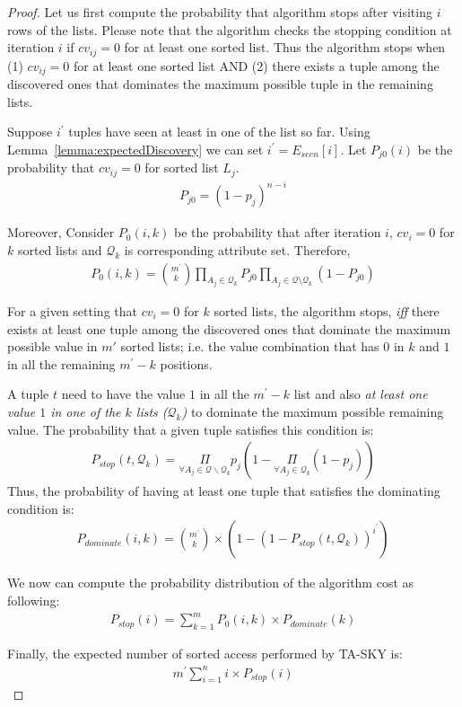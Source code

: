 \begin{proof}
Let us first compute the probability that algorithm stops after visiting $i$ rows of the lists. Please note that the algorithm checks the stopping condition at iteration $i$ if $cv_{ij} = 0$ for at least one sorted list. Thus the algorithm stops when (1) $cv_{ij} = 0$ for at least one sorted list AND (2) there exists a tuple among the discovered ones that dominates the maximum possible tuple in the remaining lists.

Suppose $i^\prime$ tuples have seen at least in one of the list so far. Using Lemma~\ref{lemma:expectedDiscovery} we can set $i^\prime = E_{seen}[i]$. Let $P_{j0}(i)$ be the probability that $cv_{ij} = 0$ for sorted list $L_j$.
\begin{align}
P_{j0} = (1 - p_j)^{n-i}
\end{align}

Moreover, Consider $P_0(i, k)$ be the probability that after iteration $i$, $cv_i = 0$ for $k$ sorted lists and $\mathcal{Q}_k$ is corresponding attribute set. Therefore,
\begin{align}
P_0(i, k) = {m^\prime \choose k} \prod_{A_j \in \mathcal{Q}_k} P_{j0} \prod_{A_j \in \mathcal{Q} \setminus \mathcal{Q}_k} (1 - P_{j0})
\end{align}

For a given setting that $cv_i = 0$ for $k$ sorted lists, the algorithm stops, {\it iff} there exists at least one tuple among the discovered ones that dominate the maximum possible value in $m'$ sorted lists; i.e. the value combination that has $0$ in $k$ and $1$ in all the remaining $m^\prime - k$ positions.

A tuple $t$ need to have the value $1$ in all the $m^\prime - k$ list and also \emph{at least one value $1$ in one of the $k$ lists ($\mathcal{Q}_k$)} to dominate the maximum possible remaining value. The probability that a given tuple satisfies this condition is:
\begin{align}
P_{stop}(t, \mathcal{Q}_k) = \underset{\forall A_j \in \mathcal{Q}\backslash \mathcal{Q}_k} {\Pi} p_j (1-\underset{\forall A_j \in \mathcal{Q}_k} {\Pi} (1 - p_j))
\end{align}
Thus, the probability of having at least one tuple that satisfies the dominating condition is:
\begin{align}
P_{dominate}(i, k) = {m^\prime \choose k} \times (1 - (1 - P_{stop}(t, \mathcal{Q}_k))^{i^\prime})
\end{align}

We now can compute the probability distribution of the algorithm cost as following:
\begin{align}
P_{stop}(i) = \sum_{k=1}^m P_0(i, k) \times P_{dominate}(k)
\end{align}

Finally, the expected number of sorted access performed by TA-SKY is:
\begin{align}
m^\prime \sum_{i=1}^n i\times P_{stop}(i)
\end{align}
\end{proof}